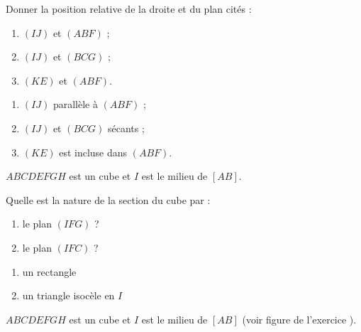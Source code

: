 \documentclass{cornouaille}
\begin{document}
\begin{colonne*exercice}
\begin{exercice*}\label{G2Exo3}
  Donner la position relative de la droite et du plan cités :
  \begin{enumerate}
  \item $(IJ)$ et $(ABF)$ ;
  \item $(IJ)$ et $(BCG)$ ;
  \item $(KE)$ et $(ABF)$.
  \end{enumerate}
\end{exercice*}
\begin{corrige}
  \begin{enumerate}
  \item $(IJ)$ parallèle à $(ABF)$ ;
  \item $(IJ)$ et $(BCG)$ sécants ;
  \item $(KE)$ est incluse dans $(ABF)$.
  \end{enumerate}  
\end{corrige}

\begin{exercice*}\label{G2Exo4}
  $ABCDEFGH$ est un cube et $I$ est le milieu de $[AB]$.

  \begin{center}
    
  \end{center}

  Quelle est la nature de la section du cube par :
  \begin{enumerate}
  \item le plan $(IFG)$ ?
  \item le plan $(IFC)$ ?
  \end{enumerate}
\end{exercice*}
\begin{corrige}
\begin{enumerate}
\item un rectangle
\item un triangle isocèle en $I$
\end{enumerate}
\end{corrige}

\columnbreak

\begin{exercice*}
  $ABCDEFGH$ est un cube et $I$ est le milieu de $[AB]$ (voir figure
  de l'exercice ).


\end{exercice*}
\end{colonne*exercice}
\end{document}
